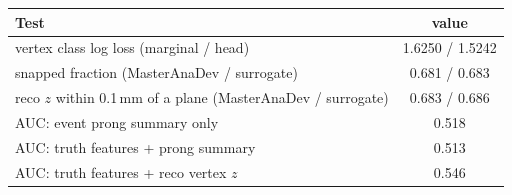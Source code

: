 \begin{tabular}{lc}
\toprule
Test & value \\
\midrule
vertex class log loss (marginal / head) & 1.6250 / 1.5242 \\
snapped fraction (MasterAnaDev / surrogate) & 0.681 / 0.683 \\
reco $z$ within 0.1\,mm of a plane (MasterAnaDev / surrogate) & 0.683 / 0.686 \\
\midrule
AUC: event prong summary only & 0.518 \\
AUC: truth features + prong summary & 0.513 \\
AUC: truth features + reco vertex $z$ & 0.546 \\
\bottomrule
\end{tabular}
